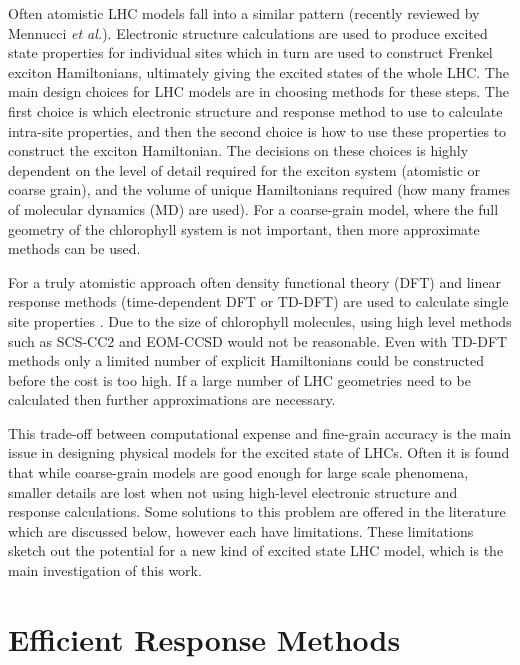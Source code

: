 Often atomistic LHC models fall into a similar pattern (recently reviewed by Mennucci 
\emph{et al.})\cite{Cignoni2022}. Electronic structure calculations are used to
produce excited state properties for individual sites which in turn are used to
construct Frenkel exciton Hamiltonians, ultimately giving the excited states of
the whole LHC. The main design choices for LHC models are in choosing methods for
these steps. The first choice is which electronic structure and response method 
to use to calculate intra-site properties, and then the second choice is how to 
use these properties to construct the exciton Hamiltonian. The decisions on these
choices is highly dependent on the level of detail required for the exciton system
(atomistic or coarse grain), and the volume of unique Hamiltonians required (how 
many frames of molecular dynamics (MD) are used). For a coarse-grain model, where
the full geometry of the chlorophyll system is not important, then more approximate 
methods can be used.

For a truly atomistic approach often density functional theory (DFT) and linear 
response methods (time-dependent DFT or TD-DFT) are used to calculate single site
properties \cite{Cignoni2022}. Due to the size of chlorophyll molecules, using high
level methods such as SCS-CC2 and EOM-CCSD would not be reasonable. Even with TD-DFT
methods only a limited number of explicit Hamiltonians could be constructed before
the cost is too high. If a large number of LHC geometries need to be calculated 
then further approximations are necessary.

This trade-off between computational expense and fine-grain accuracy is the main
issue in designing physical models for the excited state of LHCs. Often it is found
that while coarse-grain models are good enough for large scale phenomena, smaller
details are lost when not using high-level electronic structure and response calculations.
Some solutions to this problem are offered in the literature which are discussed 
below, however each have limitations. These limitations sketch out the potential 
for a new kind of excited state LHC model, which is the main investigation of this
work.

\section{Efficient Response Methods}
\label{sec:efficient_response_methods}


